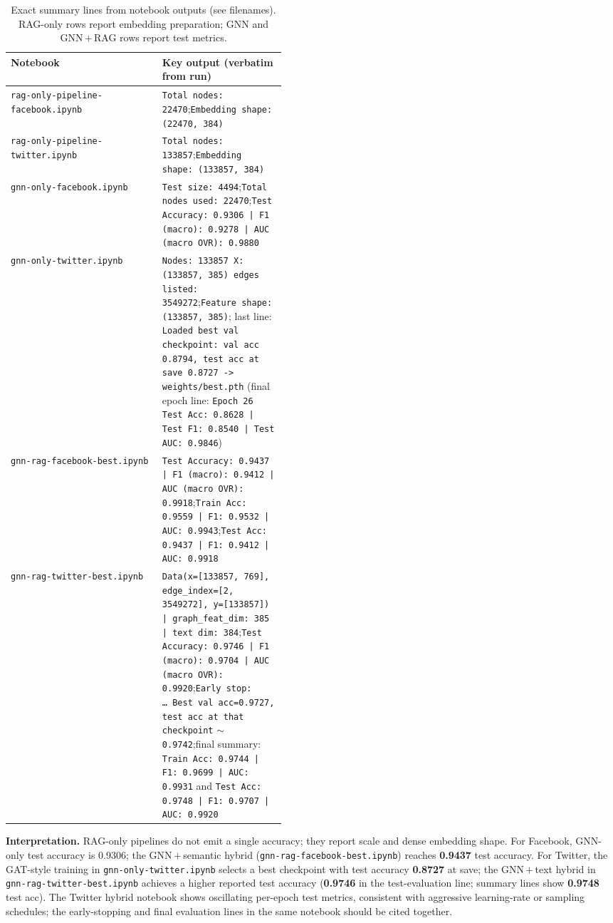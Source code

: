 \documentclass[conference]{IEEEtran}
\begin{document}
\begin{table}[t]
\centering
\caption{Exact summary lines from notebook outputs (see filenames). RAG-only rows report embedding preparation; GNN and GNN\,$+$\,RAG rows report test metrics.}
\label{tab:nbmetrics}
\small
\begin{tabular}{@{}l p{0.45\linewidth}@{}}
\toprule
\textbf{Notebook} & \textbf{Key output (verbatim from run)} \\
\midrule
\texttt{rag-only-pipeline-facebook.ipynb} & \texttt{Total nodes: 22470};\quad \texttt{Embedding shape: (22470, 384)} \\
\texttt{rag-only-pipeline-twitter.ipynb} & \texttt{Total nodes: 133857};\quad \texttt{Embedding shape: (133857, 384)} \\
\texttt{gnn-only-facebook.ipynb} & \texttt{Test size: 4494};\quad \texttt{Total nodes used: 22470};\quad \texttt{Test Accuracy: 0.9306 | F1 (macro): 0.9278 | AUC (macro OVR): 0.9880} \\
\texttt{gnn-only-twitter.ipynb} & \texttt{Nodes: 133857 X: (133857, 385) edges listed: 3549272};\quad \texttt{Feature shape: (133857, 385)}; last line: \texttt{Loaded best val checkpoint: val acc 0.8794, test acc at save 0.8727 -> weights/best.pth} (final epoch line: \texttt{Epoch~26} \texttt{Test Acc: 0.8628 | Test F1: 0.8540 | Test AUC: 0.9846}) \\
\texttt{gnn-rag-facebook-best.ipynb} & \texttt{Test Accuracy: 0.9437 | F1 (macro): 0.9412 | AUC (macro OVR): 0.9918};\quad \texttt{Train Acc: 0.9559 | F1: 0.9532 | AUC: 0.9943};\quad \texttt{Test Acc: 0.9437 | F1: 0.9412 | AUC: 0.9918} \\
\texttt{gnn-rag-twitter-best.ipynb} & \texttt{Data(x=[133857, 769], edge\_index=[2, 3549272], y=[133857]) | graph\_feat\_dim: 385 | text dim: 384};\quad \texttt{Test Accuracy: 0.9746 | F1 (macro): 0.9704 | AUC (macro OVR): 0.9920};\quad \texttt{Early stop: \ldots\ Best val acc=0.9727, test acc at that checkpoint} $\sim$ \texttt{0.9742};\quad final summary: \texttt{Train Acc: 0.9744 | F1: 0.9699 | AUC: 0.9931} and \texttt{Test Acc: 0.9748 | F1: 0.9707 | AUC: 0.9920} \\
\bottomrule
\end{tabular}
\end{table}

\noindent\textbf{Interpretation.} RAG-only pipelines do not emit a single accuracy; they report scale and dense embedding shape. For Facebook, GNN-only test accuracy is 0.9306; the GNN\,$+$\,semantic hybrid (\texttt{gnn-rag-facebook-best.ipynb}) reaches \textbf{0.9437} test accuracy. For Twitter, the GAT-style training in \texttt{gnn-only-twitter.ipynb} selects a best checkpoint with test accuracy \textbf{0.8727} at save; the GNN\,$+$\,text hybrid in \texttt{gnn-rag-twitter-best.ipynb} achieves a higher reported test accuracy (\textbf{0.9746} in the test-evaluation line; summary lines show \textbf{0.9748} test acc). The Twitter hybrid notebook shows oscillating per-epoch test metrics, consistent with aggressive learning-rate or sampling schedules; the early-stopping and final evaluation lines in the same notebook should be cited together.
\end{document}
